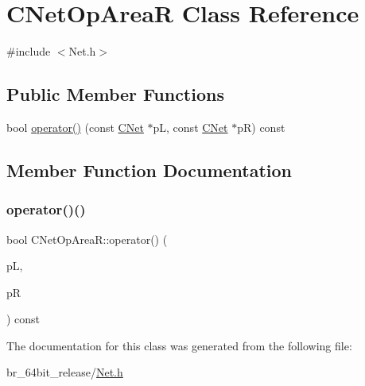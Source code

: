 \hypertarget{classCNetOpAreaR}{}\section{C\+Net\+Op\+AreaR Class Reference}
\label{classCNetOpAreaR}


{\ttfamily \#include $<$Net.\+h$>$}

\subsection*{Public Member Functions}
\begin{DoxyCompactItemize}
\item 
bool \mbox{\hyperlink{classCNetOpAreaR_a98890293239d3c826049aedd8f8e83af}{operator()}} (const \mbox{\hyperlink{classCNet}{C\+Net}} $\ast$pL, const \mbox{\hyperlink{classCNet}{C\+Net}} $\ast$pR) const
\end{DoxyCompactItemize}


\subsection{Member Function Documentation}
\mbox{\label{classCNetOpAreaR_a98890293239d3c826049aedd8f8e83af}} 
\subsubsection{\texorpdfstring{operator()()}{operator()()}}
{\footnotesize\ttfamily bool C\+Net\+Op\+Area\+R\+::operator() (\begin{DoxyParamCaption}\item[{const \mbox{\hyperlink{classCNet}{C\+Net}} $\ast$}]{pL,  }\item[{const \mbox{\hyperlink{classCNet}{C\+Net}} $\ast$}]{pR }\end{DoxyParamCaption}) const\hspace{0.3cm}{\ttfamily [inline]}}



The documentation for this class was generated from the following file\+:\begin{DoxyCompactItemize}
\item 
br\+\_\+64bit\+\_\+release/\mbox{\hyperlink{Net_8h}{Net.\+h}}\end{DoxyCompactItemize}
